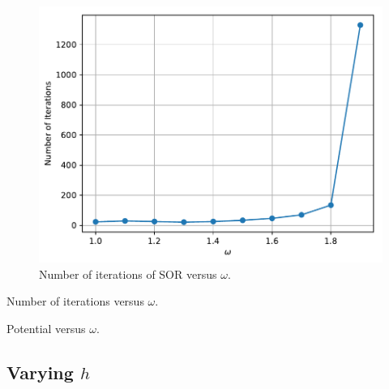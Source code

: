 \documentclass[a4paper,titlepage]{article}
\begin{document}
	\begin{figure}[!htb]
		\centering
		\includegraphics[width=\columnwidth]{plots/q3b.pdf}
		\caption
		{Number of iterations of SOR versus $\omega$.}
		\label{fig:q3b}
	\end{figure}

	\begin{table}[!htb]
		\centering
		\caption{Number of iterations versus $\omega$.}
		\label{tabel:q3b_iterations}
	\end{table}

	\begin{table}[!htb]
		\centering
		\caption{Potential versus $\omega$.}
		\label{tabel:q3b_potential}
	\end{table}
	
	\subsection{Varying $h$}
	
\end{document}
